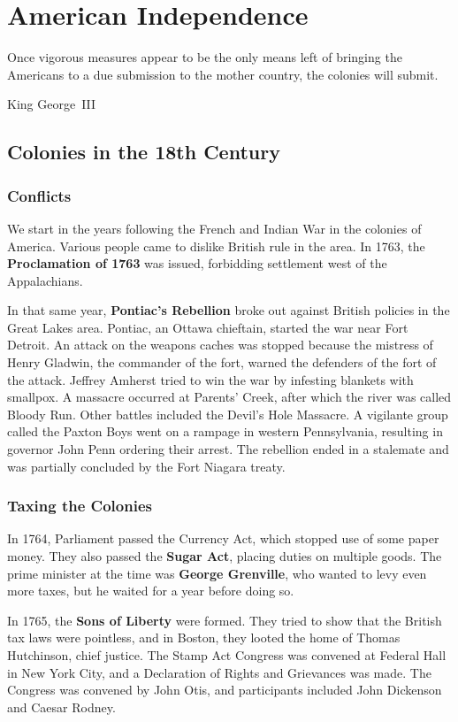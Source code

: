 \chapter{American Independence}

\epigraph{%
  Once vigorous measures appear to be the only means left
  of bringing the Americans to a due submission to the mother country,
  the colonies will submit.
}{King George~III}

\section{Colonies in the 18th Century}

\subsection*{Conflicts}

We start in the years following the French and Indian War in the colonies of America.
Various people came to dislike British rule in the area.
In 1763, the \textbf{Proclamation of 1763} was issued,
forbidding settlement west of the Appalachians.

In that same year,
\textbf{Pontiac's Rebellion} broke out against British policies in the Great Lakes area.
Pontiac, an Ottawa chieftain, started the war near Fort Detroit.
An attack on the weapons caches was stopped because the mistress of Henry Gladwin,
the commander of the fort,
warned the defenders of the fort of the attack.
Jeffrey Amherst tried to win the war by infesting blankets with smallpox.
A massacre occurred at Parents' Creek, after which the river was called Bloody Run.
Other battles included the Devil's Hole Massacre.
A vigilante group called the Paxton Boys went on a rampage in western Pennsylvania,
resulting in governor John Penn ordering their arrest.
The rebellion ended in a stalemate and was partially concluded by the Fort Niagara treaty.

\subsection*{Taxing the Colonies}

In 1764, Parliament passed the Currency Act, which stopped use of some paper money.
They also passed the \textbf{Sugar Act}, placing duties on multiple goods.
The prime minister at the time was \textbf{George Grenville}, who wanted to levy even more taxes,
but he waited for a year before doing so.

In 1765, the \textbf{Sons of Liberty} were formed.
They tried to show that the British tax laws were pointless,
and in Boston, they looted the home of Thomas Hutchinson, chief justice.
The Stamp Act Congress was convened at Federal Hall in New York City,
and a Declaration of Rights and Grievances was made.
The Congress was convened by John Otis, and participants included John Dickenson and Caesar Rodney.

